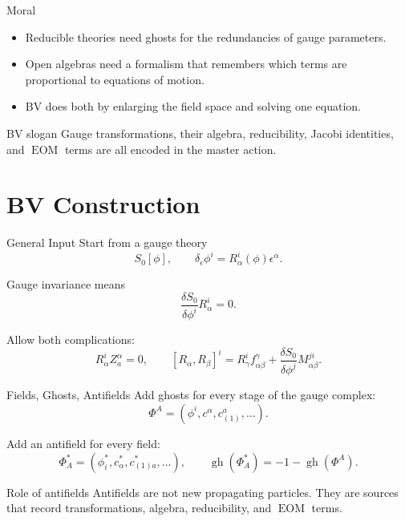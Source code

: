 \documentclass[aspectratio=169,professionalfonts]{beamer}
\newcommand{\gh}{\ensuremath{\operatorname{gh}}}
\newcommand{\EOM}{\ensuremath{\operatorname{EOM}}}
\begin{document}
\begin{frame}{Moral}
  \begin{itemize}
    \item Reducible theories need ghosts for the redundancies of gauge
      parameters.
    \item Open algebras need a formalism that remembers which terms are
      proportional to equations of motion.
    \item BV does both by enlarging the field space and solving one equation.
  \end{itemize}

  \vspace{0.25cm}
  \begin{block}{BV slogan}
    Gauge transformations, their algebra, reducibility, Jacobi identities, and
    \EOM{} terms are all encoded in the master action.
  \end{block}
\end{frame}

\section{BV Construction}

\begin{frame}{General Input}
  Start from a gauge theory
  \[
    S_0[\phi],
    \qquad
    \delta_\epsilon\phi^i=R^i_\alpha(\phi)\epsilon^\alpha .
  \]

  Gauge invariance means
  \[
    \frac{\delta S_0}{\delta\phi^i}R^i_\alpha=0 .
  \]

  Allow both complications:
  \[
    R^i_\alpha Z^\alpha_a=0,
    \qquad
    [R_\alpha,R_\beta]^i
    =R^i_\gamma f^\gamma_{\alpha\beta}
    +\frac{\delta S_0}{\delta\phi^j}M^{ji}_{\alpha\beta}.
  \]
\end{frame}

\begin{frame}{Fields, Ghosts, Antifields}
  Add ghosts for every stage of the gauge complex:
  \[
    \Phi^A=(\phi^i,c^\alpha,c^a_{(1)},\ldots).
  \]

  Add an antifield for every field:
  \[
    \Phi_A^*=(\phi_i^*,c_\alpha^*,c^*_{(1)a},\ldots),
    \qquad
    \gh(\Phi_A^*)=-1-\gh(\Phi^A).
  \]

  \begin{exampleblock}{Role of antifields}
    Antifields are not new propagating particles. They are sources that record
    transformations, algebra, reducibility, and \EOM{} terms.
  \end{exampleblock}
\end{frame}
\end{document}
